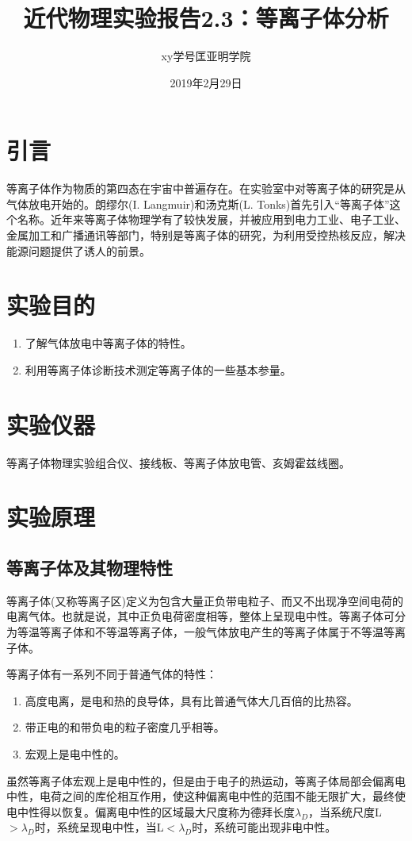 \documentclass[a4paper]{article}
\title{近代物理实验报告2.3：等离子体分析}
\author{xy\quad 学号\quad 匡亚明学院}
\date{2019年2月29日}
\begin{document}
\maketitle


\section{引言}
等离子体作为物质的第四态在宇宙中普遍存在。在实验室中对等离子体的研究是从气体放电开始的。朗缪尔(I. Langmuir)和汤克斯(L. Tonks)首先引入“等离子体”这个名称。近年来等离子体物理学有了较快发展，并被应用到电力工业、电子工业、金属加工和广播通讯等部门，特别是等离子体的研究，为利用受控热核反应，解决能源问题提供了诱人的前景。

\section{实验目的}
\begin{enumerate}
\item 了解气体放电中等离子体的特性。
\item 利用等离子体诊断技术测定等离子体的一些基本参量。
\end{enumerate}

\section{实验仪器}
等离子体物理实验组合仪、接线板、等离子体放电管、亥姆霍兹线圈。

\section{实验原理}
\subsection{等离子体及其物理特性}
等离子体(又称等离子区)定义为包含大量正负带电粒子、而又不出现净空间电荷的电离气体。也就是说，其中正负电荷密度相等，整体上呈现电中性。等离子体可分为等温等离子体和不等温等离子体，一般气体放电产生的等离子体属于不等温等离子体。

等离子体有一系列不同于普通气体的特性：
\begin{enumerate}
\item 高度电离，是电和热的良导体，具有比普通气体大几百倍的比热容。
\item 带正电的和带负电的粒子密度几乎相等。
\item 宏观上是电中性的。
\end{enumerate}
虽然等离子体宏观上是电中性的，但是由于电子的热运动，等离子体局部会偏离电中性，电荷之间的库伦相互作用，使这种偏离电中性的范围不能无限扩大，最终使电中性得以恢复。偏离电中性的区域最大尺度称为德拜长度$\lambda_D$，当系统尺度L$>\lambda_D$时，系统呈现电中性，当L$<\lambda_D$时，系统可能出现非电中性。
\end{document}
